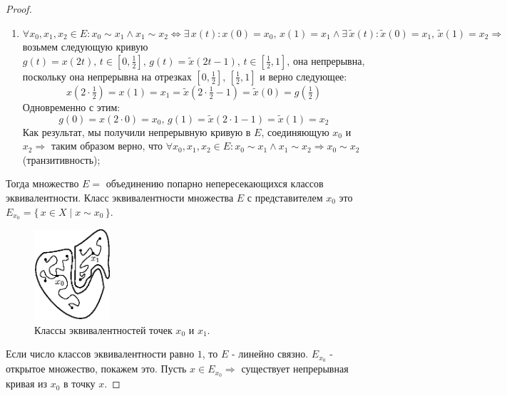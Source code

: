 \documentclass[12pt]{article}
\theoremstyle{definition}
\begin{document}
\begin{proof}
\begin{enumerate}[label ={(\arabic*)}]
		\item $\forall x_0, x_1, x_2 \in E \colon x_0 \sim x_1 \wedge x_1 \sim x_2 \Leftrightarrow \exists \, x(t) \colon x(0) = x_0, \, x(1) = x_1 \wedge \exists \, \widetilde{x}(t)\colon \widetilde{x}(0) = x_1, \, \widetilde{x}(1) = x_2 \Rightarrow$ возьмем следующую кривую $g(t) = x(2t), \, t \in [0,\tfrac{1}{2}], \, g(t) = \widetilde{x}(2t-1), \,  t \in [\tfrac{1}{2},1]$, она непрерывна, поскольку она непрерывна на отрезках $[0,\tfrac{1}{2}], \, [\tfrac{1}{2},1]$ и верно следующее: 
		$$
			x(2{\cdot}\tfrac{1}{2}) = x(1) = x_1 = \widetilde{x}(2{\cdot}\tfrac{1}{2}-1) = \widetilde{x}(0) = g(\tfrac{1}{2})
		$$
		Одновременно с этим: 
		$$
			g(0) = x(2{\cdot}0) = x_0, \, g(1) = \widetilde{x}(2{\cdot}1-1) = \widetilde{x}(1) = x_2 
		$$
		Как результат, мы получили непрерывную кривую в $E$, соединяющую $x_0$ и $x_2 \Rightarrow$ таким образом верно, что $\forall x_0, x_1, x_2 \in E \colon x_0 \sim x_1 \wedge x_1 \sim x_2 \Rightarrow x_0 \sim x_2$ (транзитивность);
	\end{enumerate}
	Тогда множество $E = $ объединению попарно непересекающихся классов эквивалентности. Класс эквивалентности множества $E$ с представителем $x_0$ это $E_{x_0} = \{\,x \in X \mid x \sim x_0 \,\}$. 
	\begin{figure}[H]
		\centering
		\includegraphics[width=0.25\textwidth]{11_2.eps}
		\caption{Классы эквивалентностей точек $x_0$ и $x_1$.}
		\label{11_2}
	\end{figure}
	Если число классов эквивалентности равно $1$, то $E$ - линейно связно. $E_{x_0}$ - открытое множество, покажем это. Пусть $x \in E_{x_0} \Rightarrow$ существует непрерывная кривая из $x_0$ в точку $x$. 


\end{proof}
\end{document}
